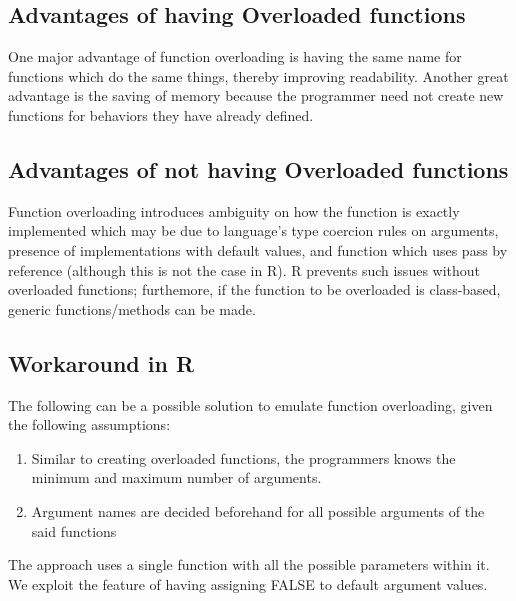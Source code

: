 \documentclass[12pt]{article}
\begin{document}
\subsection{Advantages of having Overloaded functions}
One major advantage of function overloading is having the same name for functions which do the same things, thereby improving readability. Another great advantage is the saving of memory because the programmer need not create new functions for behaviors they have already defined.

\subsection{Advantages of not having Overloaded functions}
Function overloading introduces ambiguity on how the function is exactly implemented which may be due to language's type coercion rules on arguments, presence of implementations with default values, and function which uses pass by reference (although this is not the case in R). R prevents such issues without overloaded functions; furthemore, if the function to be overloaded is class-based, generic functions/methods can be made.

\subsection{Workaround in R}
 The following can be a possible solution to emulate function overloading, given the following assumptions:
\begin{enumerate}
\item Similar to creating overloaded functions, the programmers knows the minimum and maximum number of arguments.
\item Argument names are decided beforehand for all possible arguments of the said functions
\end{enumerate}

The approach uses a single function with all the possible parameters within it. We exploit the feature of having assigning FALSE to default argument values.
\end{document}
